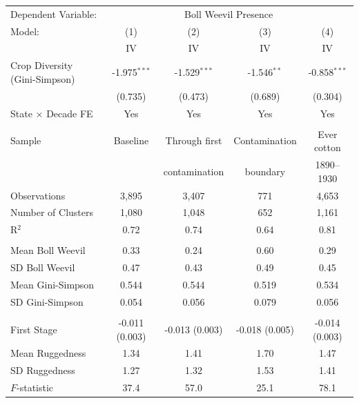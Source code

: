 \begingroup
\centering
\setlength{\tabcolsep}{5pt}
\begin{tabular}{lcccc}
   \toprule \toprule
   Dependent Variable: & \multicolumn{4}{c}{Boll Weevil Presence} \\
   Model: & (1) & (2) & (3) & (4) \\
    & IV & IV & IV & IV \\
   \midrule
   Crop Diversity (Gini-Simpson) & -1.975$^{***}$ & -1.529$^{***}$ & -1.546$^{**}$ & -0.858$^{***}$ \\
    & (0.735) & (0.473) & (0.689) & (0.304) \\
   State $\times$ Decade FE & Yes & Yes & Yes & Yes \\
    &  &  &  &  \\
   Sample & Baseline & Through first & Contamination & Ever cotton \\
    &  & contamination & boundary & 1890--1930 \\
   \midrule
   Observations & 3,895 & 3,407 & 771 & 4,653 \\
   Number of Clusters & 1,080 & 1,048 & 652 & 1,161 \\
   R$^2$ & 0.72 & 0.74 & 0.64 & 0.81 \\
    &  &  &  &  \\
   Mean Boll Weevil & 0.33 & 0.24 & 0.60 & 0.29 \\
   SD Boll Weevil & 0.47 & 0.43 & 0.49 & 0.45 \\
   Mean Gini-Simpson & 0.544 & 0.544 & 0.519 & 0.534 \\
   SD Gini-Simpson & 0.054 & 0.056 & 0.079 & 0.056 \\
    &  &  &  &  \\
   \midrule
   First Stage & -0.011 (0.003) & -0.013 (0.003) & -0.018 (0.005) & -0.014 (0.003) \\
   Mean Ruggedness & 1.34 & 1.41 & 1.70 & 1.47 \\
   SD Ruggedness & 1.27 & 1.32 & 1.53 & 1.41 \\
   $F$-statistic & 37.4 & 57.0 & 25.1 & 78.1 \\
   \bottomrule \bottomrule
\end{tabular}
\par\endgroup
